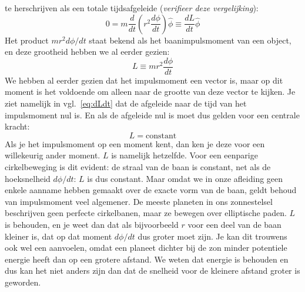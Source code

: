 te herschrijven als een totale tijdsafgeleide ({\it verifieer deze vergelijking}):
\begin{equation}\label{eq:dLdt}
0 = m\frac{d}{dt}\left(r^2\frac{d\phi}{dt}\right) \hat{\phi} \equiv \frac{dL}{dt} \hat{\phi}
\end{equation}
Het product $m r^2 d\phi/dt$ staat bekend als het baanimpulsmoment van een object, en deze grootheid
hebben we al eerder gezien:
\begin{equation}
L \equiv m r^2 \frac{d\phi}{dt}
\end{equation}
We hebben al eerder gezien dat het impulsmoment een vector is, maar op dit moment is het voldoende om alleen naar de grootte van
deze vector te kijken. Je ziet namelijk in vgl.~\ref{eq:dLdt} dat de afgeleide naar de tijd van het 
impulsmoment nul is. En als de afgeleide nul is moet dus gelden voor een centrale kracht:
\begin{equation}
L = \mbox{constant}
\end{equation}
Als je het impulsmoment op een moment kent, dan ken je deze voor een willekeurig ander moment.
$L$ is namelijk hetzelfde. Voor een eenparige cirkelbeweging is dit evident: de straal van de baan is constant,
net als de hoeksnelheid $d\phi/dt$: $L$ is dus constant. Maar omdat we in onze afleiding geen
enkele aanname hebben gemaakt over de exacte vorm van de baan, geldt behoud van impulsmoment
veel algemener. De meeste planeten in ons zonnestelsel beschrijven geen perfecte cirkelbanen, maar 
ze bewegen over elliptische paden. $L$ is behouden, en je weet dan dat als bijvoorbeeld $r$ voor een
deel van de baan kleiner is, dat op dat moment $d\phi / dt$ dus groter moet zijn. Je kan dit trouwens ook
wel een aanvoelen, omdat een planeet dichter bij de zon minder potentiele energie heeft dan op een
grotere afstand. We weten dat energie is behouden en dus kan het niet anders zijn dan dat de snelheid
voor de kleinere afstand groter is geworden.

